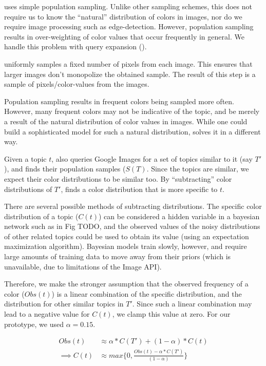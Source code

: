 \system uses simple population sampling. Unlike other sampling schemes, this does not require us to know the ``natural'' distribution of colors in images, nor do we require image processing such as edge-detection. However, population sampling results in over-weighting of color values that occur frequently in general. We handle this problem with query expansion ().

\system uniformly samples a fixed number of pixels from each image. This ensures that larger images don't monopolize the obtained sample. The result of this step is a sample of pixels/color-values from the images.

Population sampling results in frequent colors being sampled more often. However, many frequent colors may not be indicative of the topic, and be merely a result of the natural distribution of color values in images. While one could build a sophisticated model for such a natural distribution, \system solves it in a different way.

Given a topic $t$, \system also queries Google Images for a set of topics similar to it (say $T'$), and finds their population samples ($S(T)$. Since the topics are similar, we expect their color distributions to be similar too. By ``subtracting'' color distributions of $T'$, \system finds a color distribution that is more specific to $t$. 

There are several possible methods of subtracting distributions. The specific color distribution of a topic ($C(t)$) can be considered a hidden variable in a bayesian network such as in Fig TODO, and the observed values of the noisy distributions of other related topics could be used to obtain its value (using an expectation maximization algorithm). Bayesian models train slowly, however, and require large amounts of training data to move away from their priors (which is unavailable, due to limitations of the Image API).

Therefore, we make the stronger assumption that the observed frequency of a color ($Obs(t)$) is a linear combination of the specific distribution, and the distribution for other similar topics in $T'$. Since such a linear combination may lead to a negative value for $C(t)$, we clamp this value at zero. For our prototype, we used $\alpha = 0.15$.

\begin{align}
\label{linear-color}
Obs(t) &\approx \alpha*C(T') + (1-\alpha)*C(t) \\
\implies  C(t) &\approx max\{0,\frac{Obs(t) - \alpha*C(T')}{(1-\alpha)}\}
\end{align}


